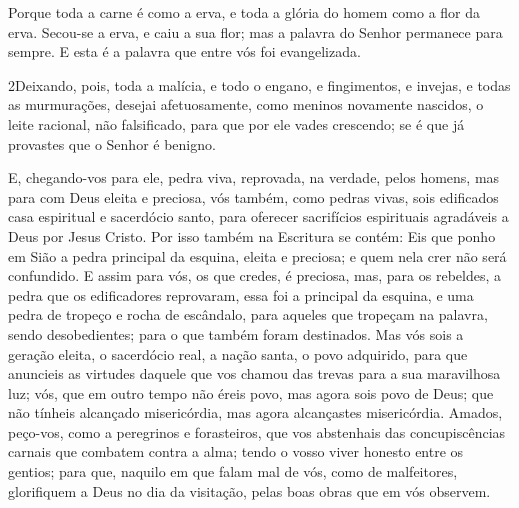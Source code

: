 Porque toda a carne é como a erva, e toda a glória do homem como
a flor da erva. Secou-se a erva, e caiu a sua flor; mas a
palavra do Senhor permanece para sempre. E esta é a palavra que
entre vós foi evangelizada.

\medskip

\lettrine{2} Deixando, pois, toda a malícia, e todo o engano,
e fingimentos, e invejas, e todas as murmurações, desejai
afetuosamente, como meninos novamente nascidos, o leite racional,
não falsificado, para que por ele vades crescendo; se é que já
provastes que o Senhor é benigno.

E, chegando-vos para ele, pedra viva, reprovada, na verdade, pelos
homens, mas para com Deus eleita e preciosa, vós também, como
pedras vivas, sois edificados casa espiritual e sacerdócio santo,
para oferecer sacrifícios espirituais agradáveis a Deus por Jesus
Cristo. Por isso também na Escritura se contém: Eis que ponho em
Sião a pedra principal da esquina, eleita e preciosa; e quem nela
crer não será confundido. E assim para vós, os que credes, é
preciosa, mas, para os rebeldes, a pedra que os edificadores
reprovaram, essa foi a principal da esquina, e uma pedra de
tropeço e rocha de escândalo, para aqueles que tropeçam na palavra,
sendo desobedientes; para o que também foram destinados. Mas vós
sois a geração eleita, o sacerdócio real, a nação santa, o povo
adquirido, para que anuncieis as virtudes daquele que vos chamou das
trevas para a sua maravilhosa luz; vós, que em outro tempo
não éreis povo, mas agora sois povo de Deus; que não tínheis
alcançado misericórdia, mas agora alcançastes misericórdia.
Amados, peço-vos, como a peregrinos e forasteiros, que vos
abstenhais das concupiscências carnais que combatem contra a alma;
tendo o vosso viver honesto entre os gentios; para que,
naquilo em que falam mal de vós, como de malfeitores, glorifiquem a
Deus no dia da visitação, pelas boas obras que em vós observem.

